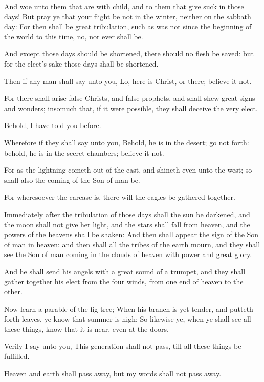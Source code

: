 \Verse And woe unto them that are with child, and to them that give suck in those days!  \Verse But pray ye that your flight be not in the winter, neither on the sabbath day: \Verse For then shall be great tribulation, such as was not since the beginning of the world to this time, no, nor ever shall be.

\Verse And except those days should be shortened, there should no flesh be saved: but for the elect's sake those days shall be shortened.

\Verse Then if any man shall say unto you, Lo, here is Christ, or there; believe it not.

\Verse For there shall arise false Christs, and false prophets, and shall shew great signs and wonders; insomuch that, if it were possible, they shall deceive the very elect.

\Verse Behold, I have told you before.

\Verse Wherefore if they shall say unto you, Behold, he is in the desert; go not forth: behold, he is in the secret chambers; believe it not.

\Verse For as the lightning cometh out of the east, and shineth even unto the west; so shall also the coming of the Son of man be.

\Verse For wheresoever the carcase is, there will the eagles be gathered together.

\Verse Immediately after the tribulation of those days shall the sun be darkened, and the moon shall not give her light, and the stars shall fall from heaven, and the powers of the heavens shall be shaken: \Verse And then shall appear the sign of the Son of man in heaven: and then shall all the tribes of the earth mourn, and they shall see the Son of man coming in the clouds of heaven with power and great glory.

\Verse And he shall send his angels with a great sound of a trumpet, and they shall gather together his elect from the four winds, from one end of heaven to the other.

\Verse Now learn a parable of the fig tree; When his branch is yet tender, and putteth forth leaves, ye know that summer is nigh: \Verse So likewise ye, when ye shall see all these things, know that it is near, even at the doors.

\Verse Verily I say unto you, This generation shall not pass, till all these things be fulfilled.

\Verse Heaven and earth shall pass away, but my words shall not pass away.

